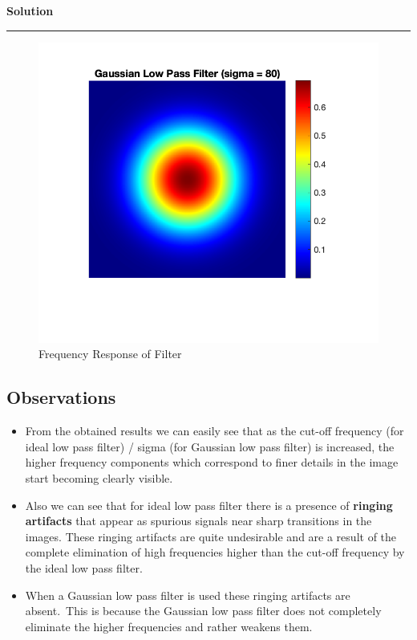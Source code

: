 \documentclass[a4paper]{article}
\newenvironment{solution}[2][]{%
    \begin{mdframed}[linecolor=green!60!black, linewidth=2pt, roundcorner=10pt, backgroundcolor=green!5!white, skipabove=12pt, skipbelow=12pt]%
        \textbf{\large #2} %
        \par\noindent\rule{\textwidth}{0.4pt} %
        \vspace{0.5em} %
}{%
    \end{mdframed}%
}
\begin{document}
\begin{solution}{Solution}
    \begin{figure}[H]
        \centering
        \includegraphics{../images/gaussian_LPF_80.png}
        \caption{Frequency Response of Filter}
    \end{figure}
    
    \subsection*{Observations}
    
    \begin{itemize}
        \item From the obtained results we can easily see that as the cut-oﬀ frequency (for ideal low pass
        ﬁlter) / sigma (for Gaussian low pass ﬁlter) is increased, the higher frequency components
        which correspond to ﬁner details in the image start becoming clearly visible.
        \item Also we can see that for ideal low pass ﬁlter there is a presence of \textbf{ringing artifacts} that appear
        as spurious signals near sharp transitions in the images. These ringing artifacts are quite
        undesirable and are a result of the complete elimination of high frequencies higher than the
        cut-oﬀ frequency by the ideal low pass ﬁlter.
        \item When a Gaussian low pass ﬁlter is used these ringing artifacts are absent.\ This is because the
        Gaussian low pass ﬁlter does not completely eliminate the higher frequencies and rather weakens
        them.
    \end{itemize}
\end{solution}
\end{document}
